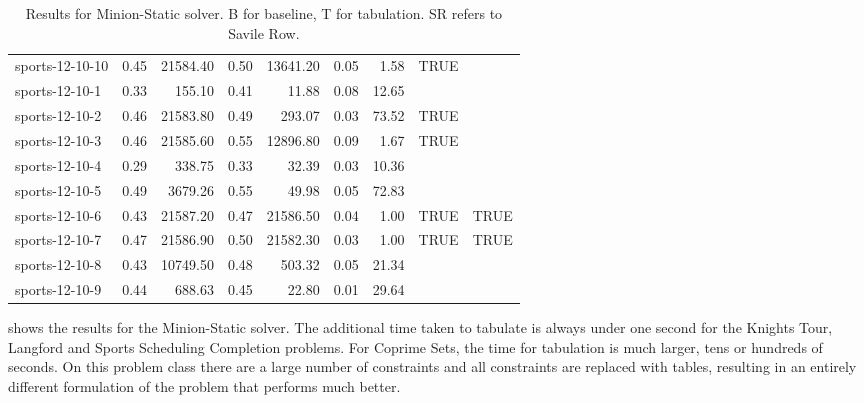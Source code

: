\documentclass[runningheads]{llncs}
\begin{document}
\begin{table}[ht]
\begin{tabular}{lrrrrrrll}
 sports-12-10-10 & 0.45 & 21584.40 & 0.50 & 13641.20 & 0.05 & 1.58 & TRUE &   \\ 
 sports-12-10-1 & 0.33 & 155.10 & 0.41 & 11.88 & 0.08 & 12.65 &   &   \\ 
 sports-12-10-2 & 0.46 & 21583.80 & 0.49 & 293.07 & 0.03 & 73.52 & TRUE &   \\ 
 sports-12-10-3 & 0.46 & 21585.60 & 0.55 & 12896.80 & 0.09 & 1.67 & TRUE &   \\ 
 sports-12-10-4 & 0.29 & 338.75 & 0.33 & 32.39 & 0.03 & 10.36 &   &   \\ 
 sports-12-10-5 & 0.49 & 3679.26 & 0.55 & 49.98 & 0.05 & 72.83 &   &   \\ 
 sports-12-10-6 & 0.43 & 21587.20 & 0.47 & 21586.50 & 0.04 & 1.00 & TRUE & TRUE \\ 
 sports-12-10-7 & 0.47 & 21586.90 & 0.50 & 21582.30 & 0.03 & 1.00 & TRUE & TRUE \\ 
 sports-12-10-8 & 0.43 & 10749.50 & 0.48 & 503.32 & 0.05 & 21.34 &   &   \\ 
 sports-12-10-9 & 0.44 & 688.63 & 0.45 & 22.80 & 0.01 & 29.64 &   &   \\ 
   \hline
\end{tabular}
\caption{Results for Minion-Static solver. B for baseline, T for tabulation. SR refers to Savile Row.}\label{tab-static}
\end{table}


 shows the results for the Minion-Static solver.  The additional time taken to tabulate is always under one second for the Knights Tour, Langford and Sports Scheduling Completion problems. For Coprime Sets, the time for tabulation is much larger, tens or hundreds of seconds. On this problem class there are a large number of constraints and all constraints are replaced with tables, resulting in an entirely different formulation of the problem that performs much better. 
\end{document}
